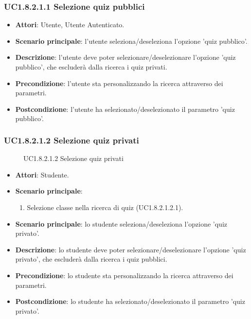 \subsubsection{UC1.8.2.1.1 Selezione quiz pubblici}
\begin{itemize}
\item \textbf{Attori}: Utente, Utente Autenticato.
\item \textbf{Scenario principale}: l'utente seleziona/deseleziona l'opzione 'quiz pubblico'.
\item \textbf{Descrizione}: l'utente deve poter selezionare/deselezionare l'opzione 'quiz pubblico', che escluderà dalla ricerca i quiz privati.
\item \textbf{Precondizione}: l'utente sta personalizzando la ricerca attraverso dei parametri.
\item \textbf{Postcondizione}: l'utente ha selezionato/deselezionato il parametro 'quiz pubblico'.
\end{itemize}
\subsubsection{UC1.8.2.1.2 Selezione quiz privati}
\begin{figure}[H]
\centering
\noindent{}
\caption{UC1.8.2.1.2 Selezione quiz privati}
\end{figure}
\begin{itemize}
\item \textbf{Attori}: Studente.
\item \textbf{Scenario principale}:
\begin{enumerate}
\item Selezione classe nella ricerca di quiz (UC1.8.2.1.2.1).
\end{enumerate}
\item \textbf{Scenario principale}: lo studente seleziona/deseleziona l'opzione 'quiz privato'.
\item \textbf{Descrizione}: lo studente deve poter selezionare/deselezionare l'opzione 'quiz privato', che escluderà dalla ricerca i quiz pubblici.
\item \textbf{Precondizione}: lo studente  sta personalizzando la ricerca attraverso dei parametri.
\item \textbf{Postcondizione}: lo studente  ha selezionato/deselezionato il parametro 'quiz privato'.
\end{itemize}
